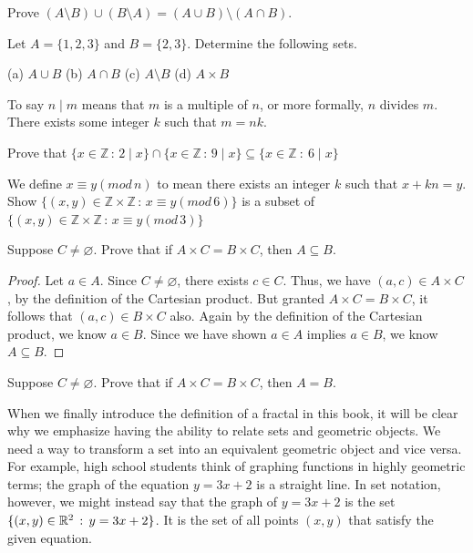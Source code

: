 \begin{exercise}
    Prove $(A\setminus B) \cup (B\setminus A) = (A\cup B) \setminus (A\cap B)$.
\end{exercise}
    \vspace{-4mm}
\begin{exercise}
  Let $A = \{1, 2, 3\}$ and $B = \{2, 3\}$.
  Determine the following sets. \par
  (a) $A \cup B$ \quad
  (b) $A \cap B$ \quad
  (c) $A \setminus B$ \quad
  (d) $A \times B$
\end{exercise}
    \vspace{-4mm}
\begin{exercise}
    To say $n\mid m$ means that $m$ is a multiple of $n$, or more formally, $n$ divides $m$. There exists some integer $k$ such that $m=nk$.\par 
    Prove that $\{x\in\mathbb{Z}\, : \, 2\mid x\}\cap \{x\in\mathbb{Z}\, : \, 9\mid x\}\subseteq \{x\in\mathbb{Z}\ : \ 6\mid x\}$
\end{exercise}
    \vspace{-4mm}
\begin{exercise}
    We define $x\equiv y (mod\, n)$ to mean there exists an integer $k$ such that $x+kn=y$. Show $\{(x,y)\in\mathbb{Z}\times\mathbb{Z}\, : \, x\equiv y (mod\, 6)\}$ is a subset of $\{(x,y)\in\mathbb{Z}\times\mathbb{Z}\, : \, x\equiv y (mod\, 3)\}$
\end{exercise}

\begin{example}
    Suppose $C\neq\varnothing$. Prove that if $A\times C = B\times C$, then $A\subseteq B$. \par
    \begin{proof}
        Let $a\in A$. Since $C\neq\varnothing$, there exists $c\in C$. Thus, we have $(a,c)\in A\times C$, by the definition of the Cartesian product. But granted $A\times C=B\times C$, it follows that $(a,c)\in B\times C$ also. Again by the definition of the Cartesian product, we know $a\in B$. Since we have shown $a\in A$ implies $a\in B$, we know $A\subseteq B$. 
    \end{proof}
\end{example}

\begin{exercise}
    Suppose $C\neq\varnothing$. Prove that if $A\times C = B\times C$, then $A=B$. 
\end{exercise}

When we finally introduce the definition of a fractal in this book, it will be clear why we emphasize having the ability to relate sets and geometric objects. We need a way to transform a set into an equivalent geometric object and vice versa. For example, high school students think of graphing functions in highly geometric terms; the graph of the equation $y=3x+2$ is a straight line. In set notation, however, we might instead say that the graph of $y=3x+2$ is the set $\{(x,y)\in\mathbb{R}^2\,:\,y=3x+2\}$. It is the set of all points $(x,y)$ that satisfy the given equation. \par


